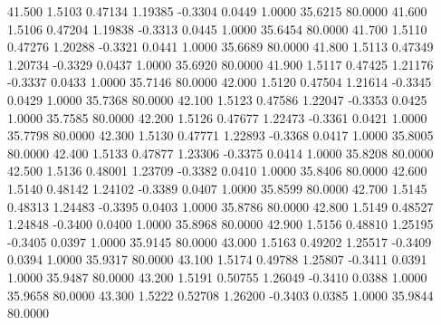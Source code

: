   41.500   1.5103   0.47134   1.19385  -0.3304   0.0449   1.0000  35.6215  80.0000
  41.600   1.5106   0.47204   1.19838  -0.3313   0.0445   1.0000  35.6454  80.0000
  41.700   1.5110   0.47276   1.20288  -0.3321   0.0441   1.0000  35.6689  80.0000
  41.800   1.5113   0.47349   1.20734  -0.3329   0.0437   1.0000  35.6920  80.0000
  41.900   1.5117   0.47425   1.21176  -0.3337   0.0433   1.0000  35.7146  80.0000
  42.000   1.5120   0.47504   1.21614  -0.3345   0.0429   1.0000  35.7368  80.0000
  42.100   1.5123   0.47586   1.22047  -0.3353   0.0425   1.0000  35.7585  80.0000
  42.200   1.5126   0.47677   1.22473  -0.3361   0.0421   1.0000  35.7798  80.0000
  42.300   1.5130   0.47771   1.22893  -0.3368   0.0417   1.0000  35.8005  80.0000
  42.400   1.5133   0.47877   1.23306  -0.3375   0.0414   1.0000  35.8208  80.0000
  42.500   1.5136   0.48001   1.23709  -0.3382   0.0410   1.0000  35.8406  80.0000
  42.600   1.5140   0.48142   1.24102  -0.3389   0.0407   1.0000  35.8599  80.0000
  42.700   1.5145   0.48313   1.24483  -0.3395   0.0403   1.0000  35.8786  80.0000
  42.800   1.5149   0.48527   1.24848  -0.3400   0.0400   1.0000  35.8968  80.0000
  42.900   1.5156   0.48810   1.25195  -0.3405   0.0397   1.0000  35.9145  80.0000
  43.000   1.5163   0.49202   1.25517  -0.3409   0.0394   1.0000  35.9317  80.0000
  43.100   1.5174   0.49788   1.25807  -0.3411   0.0391   1.0000  35.9487  80.0000
  43.200   1.5191   0.50755   1.26049  -0.3410   0.0388   1.0000  35.9658  80.0000
  43.300   1.5222   0.52708   1.26200  -0.3403   0.0385   1.0000  35.9844  80.0000
